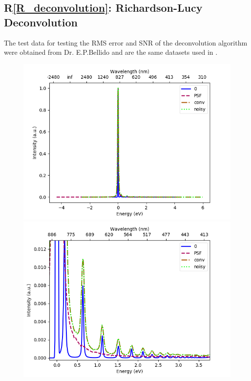 \documentclass[12pt, titlepage]{article}
\newcommand{\rref}[1]{R\ref{#1}}
\begin{document}
\subsection{\rref{R_deconvolution}: Richardson-Lucy Deconvolution}
The test data for testing the RMS error and SNR of the deconvolution algorithm were obtained from Dr. E.P.Bellido and are the same datasets used in \cite{bellido_toward_2014}.
\begin{figure}
    \includegraphics[scale=0.4]{Reference_spectra.png}
    \includegraphics[scale=0.4]{Reference_spectra2.png}

\end{figure}
\end{document}
